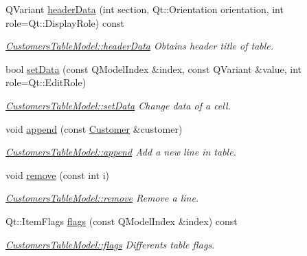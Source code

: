 \begin{DoxyCompactItemize}
Q\-Variant \hyperlink{classGui_1_1Widgets_1_1WdgModels_1_1CustomersTableModel_ac68af68b991afa792798f7b72c5c7664}{header\-Data} (int section, Qt\-::\-Orientation orientation, int role=Qt\-::\-Display\-Role) const 
\begin{DoxyCompactList}\small\item\em \hyperlink{classGui_1_1Widgets_1_1WdgModels_1_1CustomersTableModel_ac68af68b991afa792798f7b72c5c7664}{Customers\-Table\-Model\-::header\-Data} Obtains header title of table. \end{DoxyCompactList}\item 
bool \hyperlink{classGui_1_1Widgets_1_1WdgModels_1_1CustomersTableModel_a7045685ee906328da54e25205314175c}{set\-Data} (const Q\-Model\-Index \&index, const Q\-Variant \&value, int role=Qt\-::\-Edit\-Role)
\begin{DoxyCompactList}\small\item\em \hyperlink{classGui_1_1Widgets_1_1WdgModels_1_1CustomersTableModel_a7045685ee906328da54e25205314175c}{Customers\-Table\-Model\-::set\-Data} Change data of a cell. \end{DoxyCompactList}\item 
void \hyperlink{classGui_1_1Widgets_1_1WdgModels_1_1CustomersTableModel_a823210160956ca5045dff8e796c5abec}{append} (const \hyperlink{classModels_1_1Customer}{Customer} \&customer)
\begin{DoxyCompactList}\small\item\em \hyperlink{classGui_1_1Widgets_1_1WdgModels_1_1CustomersTableModel_a823210160956ca5045dff8e796c5abec}{Customers\-Table\-Model\-::append} Add a new line in table. \end{DoxyCompactList}\item 
void \hyperlink{classGui_1_1Widgets_1_1WdgModels_1_1CustomersTableModel_aa70b783d09916574eeaabfdb5ccc5240}{remove} (const int i)
\begin{DoxyCompactList}\small\item\em \hyperlink{classGui_1_1Widgets_1_1WdgModels_1_1CustomersTableModel_aa70b783d09916574eeaabfdb5ccc5240}{Customers\-Table\-Model\-::remove} Remove a line. \end{DoxyCompactList}\item 
Qt\-::\-Item\-Flags \hyperlink{classGui_1_1Widgets_1_1WdgModels_1_1CustomersTableModel_a49e82b87cf13a746f4fd1ff1c6252037}{flags} (const Q\-Model\-Index \&index) const 
\begin{DoxyCompactList}\small\item\em \hyperlink{classGui_1_1Widgets_1_1WdgModels_1_1CustomersTableModel_a49e82b87cf13a746f4fd1ff1c6252037}{Customers\-Table\-Model\-::flags} Differents table flags. \end{DoxyCompactList}\item 

\end{DoxyCompactItemize}
